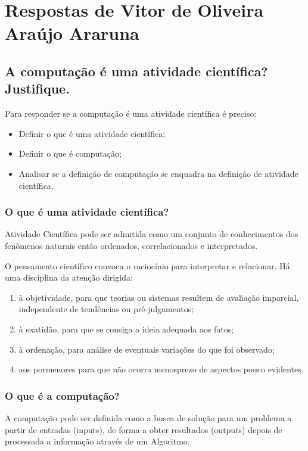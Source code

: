 \section{Respostas de Vitor de Oliveira Araújo Araruna \label{tarefa-vitorararuna-componentes-eperimento}}

\subsection{A computação é uma atividade científica? Justifique. }

Para responder se a computação é uma atividade científica é preciso:
\begin{itemize}
    \item Definir o que é uma atividade científica;
    \item Definir o que é computação;
    \item Analisar se a definição de computação se enquadra na definição de atividade científica. 
\end{itemize}

\subsubsection{O que é uma atividade científica?} Atividade Científica pode ser admitida como um conjunto de conhecimentos dos fenômenos naturais então ordenados, correlacionados e interpretados. 

O pensamento científico convoca o raciocínio para interpretar e relacionar. Há uma disciplina da atenção dirigida:

\begin{enumerate}
    \item à objetividade, para que teorias ou sistemas resultem de avaliação imparcial, independente de tendências ou pré-julgamentos;
    \item  à exatidão, para que se consiga a ideia adequada aos fatos;
    \item  à ordenação, para análise de eventuais variações do que foi observado;
    \item aos pormenores para que não ocorra menosprezo de aspectos pouco evidentes.
\end{enumerate}

\subsubsection{O que é a computação?}

A computação pode ser definida como a busca de solução para um problema a partir de entradas (inputs), de forma a obter resultados (outputs) depois de processada a informação através de um \gls{Algoritmo}.

